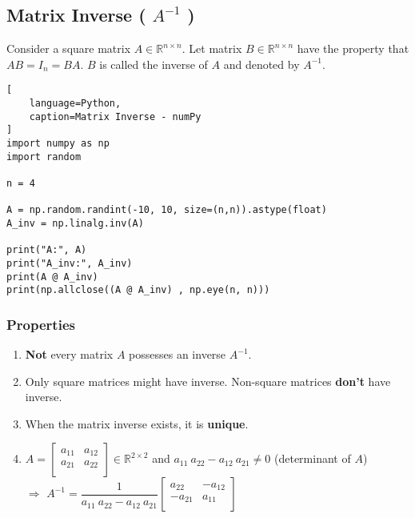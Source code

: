 \subsection{Matrix Inverse ( $A^{-1}$ ) \cite{mfml/book/mml/Deisenroth-Faisal-Ong}}

Consider a square matrix $A \in \mathbb{R}^{n\times n}$. Let matrix $B \in \mathbb{R}^{n\times n}$ have the property that $AB = I_n = BA$. $B$ is called the inverse of $A$ and denoted by $A^{-1}$.
\hfill \cite{mfml/book/mml/Deisenroth-Faisal-Ong}


\begin{lstlisting}[
    language=Python,
    caption=Matrix Inverse - numPy
]
import numpy as np
import random

n = 4

A = np.random.randint(-10, 10, size=(n,n)).astype(float)
A_inv = np.linalg.inv(A)

print("A:", A)
print("A_inv:", A_inv)
print(A @ A_inv)
print(np.allclose((A @ A_inv) , np.eye(n, n)))
\end{lstlisting}



\subsubsection{Properties}

\begin{enumerate}[itemsep=0.2cm]
    \item \textbf{Not} every matrix $A$ possesses an inverse $A^{-1}$.
    \hfill \cite{mfml/book/mml/Deisenroth-Faisal-Ong}

    \item Only square matrices might have inverse. Non-square matrices \textbf{don't} have inverse.

    \item When the matrix inverse exists, it is \textbf{unique}.
    \hfill \cite{mfml/book/mml/Deisenroth-Faisal-Ong}

    \item $
        A = \begin{bmatrix}
            a_{11} & a_{12} \\
            a_{21} & a_{22} \\
        \end{bmatrix} 
        \in \mathbb{R}^{2\times 2}
    $
    \hspace{1cm} and \hspace{1cm}
    $a_{11}\ a_{22} - a_{12}\ a_{21} \neq 0$ (determinant of $A$)\\[0.4cm] 
    $\Rightarrow$
    $
        A^{-1} = 
        \dfrac{1}{a_{11}\ a_{22} - a_{12}\ a_{21}}
        \begin{bmatrix}
            a_{22} & -a_{12} \\
            -a_{21} & a_{11} \\
        \end{bmatrix}
    $
    \hfill \cite{mfml/book/mml/Deisenroth-Faisal-Ong}

        
\end{enumerate}

